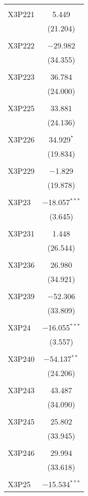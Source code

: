 \begin{table}[!htbp]
\begin{tabular}{@{\extracolsep{5pt}}lc}
  & \\ 
 X3P221 & 5.449 \\ 
  & (21.204) \\ 
  & \\ 
 X3P222 & $-$29.982 \\ 
  & (34.355) \\ 
  & \\ 
 X3P223 & 36.784 \\ 
  & (24.000) \\ 
  & \\ 
 X3P225 & 33.881 \\ 
  & (24.136) \\ 
  & \\ 
 X3P226 & 34.929$^{*}$ \\ 
  & (19.834) \\ 
  & \\ 
 X3P229 & $-$1.829 \\ 
  & (19.878) \\ 
  & \\ 
 X3P23 & $-$18.057$^{***}$ \\ 
  & (3.645) \\ 
  & \\ 
 X3P231 & 1.448 \\ 
  & (26.544) \\ 
  & \\ 
 X3P236 & 26.980 \\ 
  & (34.921) \\ 
  & \\ 
 X3P239 & $-$52.306 \\ 
  & (33.809) \\ 
  & \\ 
 X3P24 & $-$16.055$^{***}$ \\ 
  & (3.557) \\ 
  & \\ 
 X3P240 & $-$54.137$^{**}$ \\ 
  & (24.206) \\ 
  & \\ 
 X3P243 & 43.487 \\ 
  & (34.090) \\ 
  & \\ 
 X3P245 & 25.802 \\ 
  & (33.945) \\ 
  & \\ 
 X3P246 & 29.994 \\ 
  & (33.618) \\ 
  & \\ 
 X3P25 & $-$15.534$^{***}$ \\ 

\end{tabular}
\end{table}
